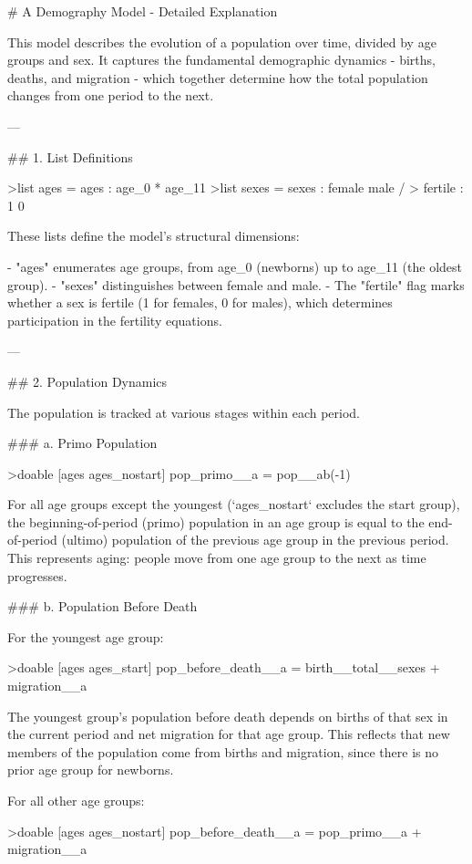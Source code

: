 \documentclass{article}
\begin{document}
{\setlength{\parskip}{1em}
 \setlength{\parindent}{0pt}
  
# A Demography Model - Detailed Explanation

This model describes the evolution of a population over time, divided by age groups and sex.
It captures the fundamental demographic dynamics - births, deaths, and migration - which together determine 
how the total population changes from one period to the next.

---

## 1. List Definitions

>list ages = ages : age_0 * age_11  
>list sexes = sexes   : female male /  
>             fertile :     1     0  

These lists define the model’s structural dimensions:

- "ages" enumerates age groups, from age_0 (newborns) up to age_11 (the oldest group).  
- "sexes" distinguishes between female and male.  
- The "fertile" flag marks whether a sex is fertile (1 for females, 0 for males), which determines participation in the fertility equations.

---

## 2. Population Dynamics

The population is tracked at various stages within each period.

### a. Primo Population

>doable [ages ages_nostart]  pop_primo__a = pop__ab(-1)

For all age groups except the youngest (`ages_nostart` excludes the start group),
the beginning-of-period (primo) population in an age group is equal to the end-of-period (ultimo) population of the previous age group in 
the previous period.
This represents aging: people move from one age group to the next as time progresses.

### b. Population Before Death

For the youngest age group:

>doable [ages ages_start]   pop_before_death__a   = birth__total__{sexes} + migration__a

The youngest group’s population before death depends on births of that sex in the current period and net migration for that age group.
This reflects that new members of the population come from births and migration, since there is no prior age group for newborns.

For all other age groups:

>doable [ages ages_nostart] pop_before_death__a   = pop_primo__a + migration__a

}
\end{document}
